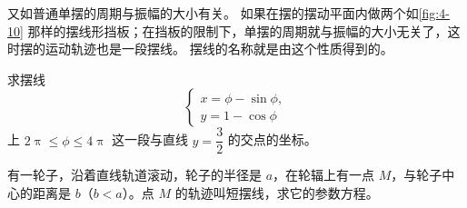 又如普通单摆的周期与振幅的大小有关。
如果在摆的摆动平面内做两个如\cref{fig:4-10} 那样的摆线形挡板；在挡板的限制下，单摆的周期就与振幅的大小无关了，这时摆的运动轨迹也是一段摆线。
摆线的名称就是由这个性质得到的。

\begin{Practice}
  \begin{question}
    \item 求摆线
    \[\begin{cases}x=\phi-\sin\phi,\\y=1-\cos\phi\end{cases}\]
    上 $2\uppi \leqslant \phi \leqslant 4\uppi$ 这一段与直线 $y=\dfrac{3}{2}$ 的交点的坐标。\par\smallskip
    \item 有一轮子，沿着直线轨道滚动，轮子的半径是 $a$，在轮辐上有一点 $M$，与轮子中心的距离是 $b$（$b<a$）。点 $M$ 的轨迹叫短摆线，求它的参数方程。
  \end{question}
\end{Practice}
